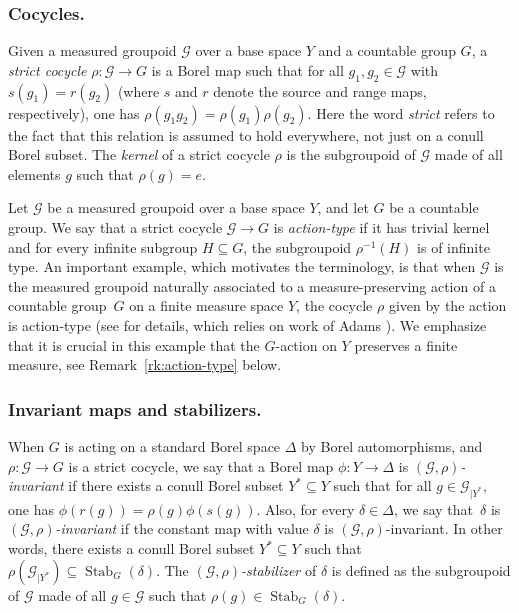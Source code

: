 \documentclass[JEP,XML,SOM,Unicode,NoFloatCountersInSection,published]{cedram}
\let\mathcal\mathscr
\theoremstyle{plain}
\theoremstyle{definition}
\newcommand{\calg}{\mathcal{G}}
\newcommand{\Stab}{\operatorname{Stab}}
\begin{document}
\subsubsection*{Cocycles.} Given a measured groupoid $\calg$ over a base space $Y$ and a countable group $G$, a \emph{strict cocycle} $\rho:\calg\to G$ is a Borel map such that for all $g_1,g_2\in\calg$ with $s(g_1)=r(g_2)$ (where $s$ and $r$ denote the source and range maps, respectively), one has $\rho(g_1g_2)=\rho(g_1)\rho(g_2)$. Here the word \emph{strict} refers to the fact that this relation is assumed to hold everywhere, not just on a conull Borel subset. The \emph{kernel} of a strict cocycle $\rho$ is the subgroupoid of $\calg$ made of all elements $g$ such that $\rho(g)=e$.

Let $\calg$ be a measured groupoid over a base space $Y$, and let $G$ be a countable group. We say that a strict cocycle $\calg\to G$ is \emph{action-type} if it has trivial kernel and for every infinite subgroup $H\subseteq G$, the subgroupoid $\rho^{-1}(H)$ is of infinite type. An important example, which motivates the terminology, is that when $\calg$ is the measured groupoid naturally associated to a measure-preserving action of a countable group~$G$ on a finite measure space $Y$, the cocycle $\rho$ given by the action is action-type (see \cite[Prop.\,2.26]{Kid-survey} for details, which relies on work of Adams \cite{Ada}). We emphasize that it is crucial in this example that the $G$-action on $Y$ preserves a finite measure, see Remark~\ref{rk:action-type} below.

\subsubsection*{Invariant maps and stabilizers.} When $G$ is acting on a standard Borel space $\Delta$ by Borel automorphisms, and $\rho:\calg\to G$ is a strict cocycle, we say that a Borel map $\phi:Y\to\Delta$ is \emph{$(\calg,\rho)$-invariant} if there exists a conull Borel subset $Y^*\subseteq Y$ such that for all $g\in\calg_{|Y^*}$, one has $\phi(r(g))=\rho(g)\phi(s(g))$.
Also, for every $\delta\in\Delta$, we say that~$\delta$ is \emph{$(\calg,\rho)$-invariant} if the constant map with value $\delta$ is $(\calg,\rho)$-invariant. In other words, there exists a conull Borel subset $Y^*\subseteq Y$ such that $\rho(\calg_{|Y^*})\subseteq \Stab_G(\delta)$. The \emph{$(\calg,\rho)$-stabilizer} of $\delta$ is defined as the subgroupoid of $\calg$ made of all $g\in\calg$ such that $\rho(g)\in\Stab_G(\delta)$.
\end{document}
